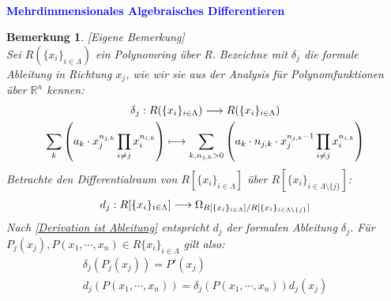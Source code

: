 \documentclass[10pt,a4paper]{report}
\newcounter{Aussage}[chapter]
\newtheorem{bem}[Aussage]{Bemerkung}
\newcommand{\functionfront}[3]{\nolinebreak{#1:#2 \longrightarrow #3}}
\newcommand{\divR}[2]{\Omega_{#1/#2}}
\newcommand{\divf}[1]{d_{#1}}
\begin{document}
\ \\
\textcolor{blue}{\textbf{Mehrdimmensionales Algebraisches Differentieren}}
\begin{bem}\label{Mehrdimmensionales Algebraisches Differentieren} \textit{[Eigene Bemerkung]}\\
Sei $R(\lbrace x_i \rbrace_{i \in \Lambda})$ ein Polynomring über R. Bezeichne mit $\delta_{j}$ die formale Ableitung in Richtung $x_j$, wie wir sie aus der Analysis für Polynomfunktionen über $\mathbb{R}^n$ kennen:
\begin{gather*}
\functionfront{\delta_{j}}{R(\lbrace x_i \rbrace_{i \in \Lambda})}{R(\lbrace x_i \rbrace_{i \in \Lambda})}\\
{\sum_k \left( a_k \cdot x_j^{n_{j,k}}\prod_{i \neq j} x_i^{n_{i,k}}\right)}
\longmapsto
{\sum_{k,n_{j,k} > 0} \left( a_k \cdot n_{j,k} \cdot x_j^{n_{j,k} - 1}\prod_{i \neq j} x_i^{n_{i,k}}\right)}
\end{gather*}
Betrachte den Differentialraum von $R[\lbrace x_i \rbrace_{i \in \Lambda}]$  über $R[\lbrace x_i \rbrace_{i \in \Lambda \setminus\lbrace j \rbrace}]$:
\begin{gather*}
\functionfront{\divf{j}}{R[\lbrace x_i \rbrace_{i \in \Lambda}]}{\divR{R[\lbrace x_i \rbrace_{i \in \Lambda}]}{R[\lbrace x_i \rbrace_{i \in \Lambda \setminus\lbrace j \rbrace}]}}
\end{gather*}
Nach \cref{Derivation ist Ableitung} entspricht $\divf{j}$ der formalen Ableitung $\delta_{j}$. Für $P_j(x_j),P(x_1,\cdots,x_n) \in R{\lbrace x_i \rbrace}_{i \in \Lambda}$ gilt also:
\begin{gather}
\delta_{j}(P_j(x_j)) = P'(x_j)\\
\divf{j}(P(x_1,\cdots,x_n)) = \delta_{j}(P(x_1, \cdots ,x_n))\divf{j}(x_j)
\end{gather}
\end{bem}
\end{document}
